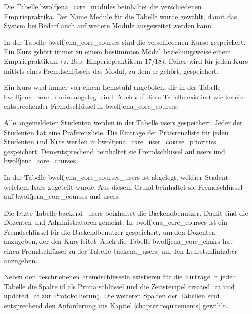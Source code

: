         Die Tabelle \textsf{bwolfjena\_core\_modules} beinhaltet die verschiedenen Empiriepraktika.
        Der Name Module für die Tabelle wurde gewählt, damit das System bei Bedarf auch auf weitere Module ausgeweitet werden kann.
        
        In der Tabelle \textsf{bwolfjena\_core\_courses} sind die verschiedenen Kurse gespeichert.
        Ein Kurs gehört immer zu einem bestimmten Modul beziehungsweise einem Empiriepraktikum (z. Bsp. Emperiepraktikum 17/18).
	    Daher wird für jeden Kurs mittels eines Fremdschlüssels das Modul, zu dem er gehört, gespeichert.
        
        Ein Kurs wird immer von einem Lehrstuhl angeboten, die in der Tabelle \textsf{bwolfjena\_core\_chairs} abgelegt sind.
        Auch auf diese Tabelle existiert wieder ein entsprechender Fremdschlüssel in \textsf{bwolfjena\_core\_courses}. 
        
        Alle angemeldeten Studenten werden in der Tabelle \textsf{users} gespeichert.
        Jeder der Studenten hat eine Präferenzliste.
        Die Einträge der Präferenzliste für jeden Studenten und Kurs werden in \textsf{bwolfjena\_core\_user\_course\_priorities} gespeichert.
        Dementsprechend beinhaltet sie Fremdschlüssel auf \textsf{users} und \textsf{bwolfjena\_core\_courses}.
        
        In der Tabelle \textsf{bwolfjena\_core\_courses\_users} ist abgelegt, welcher Student welchem Kurs zugeteilt wurde.
        Aus diesem Grund beinhaltet sie Fremdschlüssel auf \textsf{bwolfjena\_core\_courses} und \textsf{users}. 
        
        Die letzte Tabelle \textsf{backend\_users} beinhaltet die Backendbenutzer.
        Damit sind die Dozenten und Administratoren gemeint.
        In \textsf{bwolfjena\_core\_courses} ist ein Fremdschlüssel für die Backendbenutzer gespeichert, um den Dozenten anzugeben, der den Kurs leitet.
        Auch die Tabelle \textsf{bwolfjena\_core\_chairs} hat einen Fremdschlüssel zu der Tabelle \textsf{backend\_users}, um den Lehrstuhlinhaber anzugeben.
        
        Neben den beschriebenen Fremdschlüsseln existieren für die Einträge in jeder Tabelle die Spalte \textsf{id} als Primärschlüssel und die Zeitstempel \textsf{created\_at} und \textsf{updated\_at} zur Protokollierung.
        Die weiteren Spalten der Tabellen sind entsprechend den Anforderung aus Kapitel \ref{chapter:requirements} gewählt.
        
        
        
